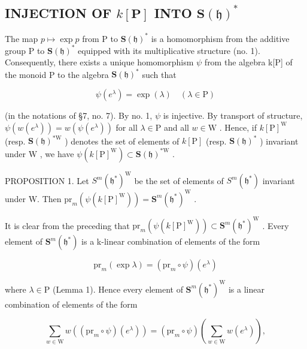 \subsection{\texorpdfstring{INJECTION OF \(k[\mathbf{P}]\) INTO \(\mathbf{S}(\mathfrak{h})^{*}\)}{INJECTION OF k{[}\textbackslash mathbf\{P\}{]} INTO \textbackslash mathbf\{S\}(\textbackslash mathfrak\{h\})\^{}\{*\}}}

The map \(p \mapsto \exp p\) from P to \(\mathbf{S}(\mathfrak{h})^{*}\) is a homomorphism from the additive group P to \(\mathbf{S}(\mathfrak{h})^{*}\) equipped with its multiplicative structure (no. 1). Consequently, there exists a unique homomorphism \(\psi\) from the algebra k{[}P{]} of the monoid P to the algebra \(\mathbf{S}(\mathfrak{h})^{*}\) such that

\[
\psi (e ^ {\lambda}) = \exp (\lambda) \quad (\lambda \in \mathrm{P})
\]

(in the notations of §7, no. 7). By no. 1, \(\psi\) is injective. By transport of structure, \(\psi(w(e^{\lambda})) = w(\psi(e^{\lambda}))\) for all \(\lambda \in \mathrm{P}\) and all \(w \in \mathrm{W}\) . Hence, if \(k[\mathrm{P}]^{\mathrm{W}}\) (resp. \(\mathbf{S}(\mathfrak{h})^{*\mathrm{W}}\) ) denotes the set of elements of \(k[\mathrm{P}]\) (resp. \(\mathbf{S}(\mathfrak{h})^{*}\) ) invariant under \(\mathrm{W}\) , we have \(\psi(k[\mathrm{P}]^{\mathrm{W}}) \subset \mathbf{S}(\mathfrak{h})^{*\mathrm{W}}\) .

PROPOSITION 1. Let \(S^m(\mathfrak{h}^*)^{\mathrm{W}}\) be the set of elements of \(S^m(\mathfrak{h}^*)\) invariant under W. Then \(\mathrm{pr}_m(\psi(k[\mathrm{P}]^{\mathrm{W}})) = \mathbf{S}^m(\mathfrak{h}^*)^{\mathrm{W}}\) .

It is clear from the preceding that \(\mathrm{pr}_{m}(\psi(k[\mathrm{P}]^{\mathrm{W}})) \subset \mathbf{S}^{m}(\mathfrak{h}^{*})^{\mathrm{W}}\) . Every element of \(\mathbf{S}^{m}(\mathfrak{h}^{*})\) is a k-linear combination of elements of the form

\[
\mathrm{pr} _ {m} (\exp \lambda) = (\mathrm{pr} _ {m} \circ \psi) (e ^ {\lambda})
\]

where \(\lambda \in \mathrm{P}\) (Lemma 1). Hence every element of \(\mathbf{S}^m (\mathfrak{h}^*)^{\mathrm{W}}\) is a linear combination of elements of the form

\[
\sum_ {w \in \mathrm{W}} w ((\mathrm{pr} _ {m} \circ \psi) (e ^ {\lambda})) = (\mathrm{pr} _ {m} \circ \psi) \left(\sum_ {w \in \mathrm{W}} w (e ^ {\lambda})\right),
\]


